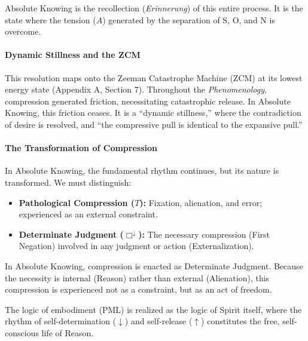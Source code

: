 Absolute Knowing is the recollection (\emph{Erinnerung}) of this entire process. It is the state where the tension (\(A\)) generated by the separation of S, O, and N is overcome.

\paragraph{Dynamic Stillness and the ZCM}\label{dynamic-stillness-and-the-zcm}

This resolution maps onto the Zeeman Catastrophe Machine (ZCM) at its lowest energy state (Appendix A, Section 7). Throughout the \emph{Phenomenology}, compression generated friction, necessitating catastrophic release. In Absolute Knowing, this friction ceases. It is a ``dynamic stillness,'' where the contradiction of desire is resolved, and ``the compressive pull is identical to the expansive pull.''

\paragraph{The Transformation of Compression}\label{the-transformation-of-compression}

In Absolute Knowing, the fundamental rhythm continues, but its nature is transformed. We must distinguish:

\begin{itemize}
\tightlist
\item
  \textbf{Pathological Compression (\(T\)):} Fixation, alienation, and error; experienced as an external constraint.
\item
  \textbf{Determinate Judgment (\(\Box^{\downarrow}\)):} The necessary compression (First Negation) involved in any judgment or action (Externalization).
\end{itemize}

In Absolute Knowing, compression is enacted as Determinate Judgment. Because the necessity is internal (Reason) rather than external (Alienation), this compression is experienced not as a constraint, but as an act of freedom.

The logic of embodiment (PML) is realized as the logic of Spirit itself, where the rhythm of self-determination (\(\downarrow\)) and self-release (\(\uparrow\)) constitutes the free, self-conscious life of Reason.
